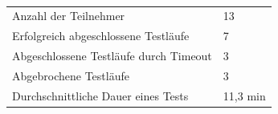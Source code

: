 \\
\begin{center}
{\footnotesize
\begin{tabular}{ p{6.5cm} p{1.2cm} }
  \hline
  Anzahl der Teilnehmer &13\vspace{0.2cm}\\
  Erfolgreich abgeschlossene Testläufe & 7\vspace{0.2cm}\\
  Abgeschlossene Testläufe durch Timeout & 3\vspace{0.2cm}\\
  Abgebrochene Testläufe & 3\vspace{0.2cm}\\
  Durchschnittliche Dauer eines Tests & 11,3 min\\
  \hline
\end{tabular}
}
\vspace{0.3cm}
 \label{tab:title}
\vspace{0.3cm}
\end{center}










